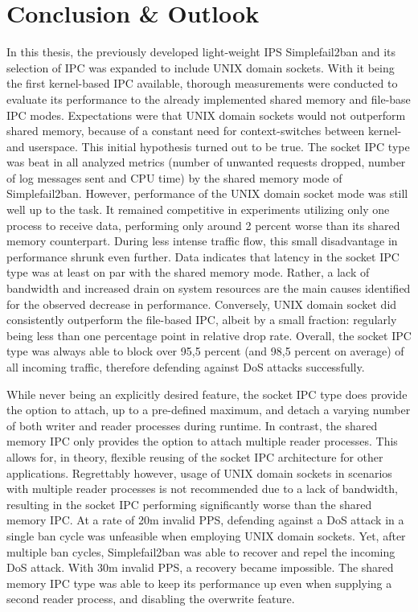 %
%

\chapter{Conclusion \& Outlook}
In this thesis, the previously developed light-weight \ac{IPS} Simplefail2ban and its selection of \ac{IPC} was expanded to include UNIX domain sockets.
With it being the first kernel-based \ac{IPC} available, thorough measurements were conducted to evaluate its performance to the already implemented shared memory and file-base \ac{IPC} modes.
Expectations were that UNIX domain sockets would not outperform shared memory, because of a constant need for context-switches between kernel- and userspace.
This initial hypothesis turned out to be true.
The socket \ac{IPC} type was beat in all analyzed metrics (number of unwanted requests dropped, number of log messages sent and \ac{CPU} time) by the shared memory mode of Simplefail2ban.
However, performance of the UNIX domain socket mode was still well up to the task.
It remained competitive in experiments utilizing only one process to receive data, performing only around 2 percent worse than its shared memory counterpart.
During less intense traffic flow, this small disadvantage in performance shrunk even further.
Data indicates that latency in the socket \ac{IPC} type was at least on par with the shared memory mode.
Rather, a lack of bandwidth and increased drain on system resources are the main causes identified for the observed decrease in performance.
Conversely, UNIX domain socket did consistently outperform the file-based \ac{IPC}, albeit by a small fraction: regularly being less than one percentage point in relative drop rate.
Overall, the socket \ac{IPC} type was always able to block over 95,5 percent (and 98,5 percent on average) of all incoming traffic, therefore defending against \ac{DoS} attacks successfully.

While never being an explicitly desired feature, the socket \ac{IPC} type does provide the option to attach, up to a pre-defined maximum, and detach a varying number of both writer and reader processes during runtime.
In contrast, the shared memory \ac{IPC} only provides the option to attach multiple reader processes.
This allows for, in theory, flexible reusing of the socket \ac{IPC} architecture for other applications.
Regrettably however, usage of UNIX domain sockets in scenarios with multiple reader processes is not recommended due to a lack of bandwidth, resulting in the socket \ac{IPC} performing significantly worse than the shared memory \ac{IPC}.
At a rate of 20m invalid \ac{PPS}, defending against a \ac{DoS} attack in a single ban cycle was unfeasible when employing UNIX domain sockets.
Yet, after multiple ban cycles, Simplefail2ban was able to recover and repel the incoming \ac{DoS} attack.
With 30m invalid \ac{PPS}, a recovery became impossible.
The shared memory \ac{IPC} type was able to keep its performance up even when supplying a second reader process, and disabling the overwrite feature.

